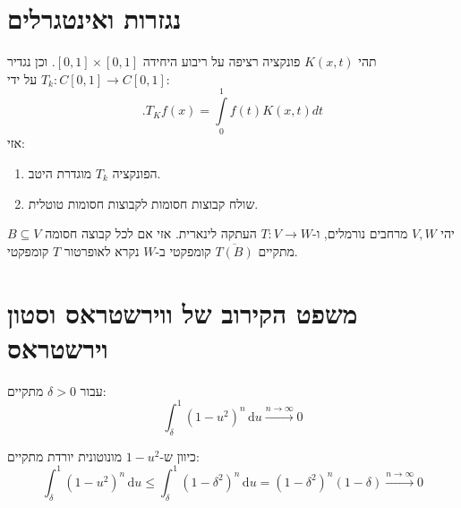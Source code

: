 \documentclass{tstextbook}
\begin{document}
\section{נגזרות ואינטגרלים}

\begin{proposition}
תהי \(K(x,t)\) פונקציה רציפה על ריבוע היחידה \([0,1]\times[0,1]\). וכן נגדיר \(T_{k}:C[0,1]\to C[0,1]\) על ידי:
$$.T_{K}f(x)=\!\!\int\limits_{0}^{1}f(t)K(x,t)d t$$
אזי:

  \begin{enumerate}
    \item הפונקציה \(T_{k}\) מוגדרת היטב. 


    \item שולח קבוצות חסומות לקבוצות חסומות טוטלית. 


  \end{enumerate}
\end{proposition}
\begin{definition}
יהי \(V,W\) מרחבים נורמלים, ו-\(T:V\to W\) העתקה לינארית. אזי אם לכל קבוצה חסומה \(B\subseteq V\) מתקיים \(\overline{T(B)}\) קומפקטי ב-\(W\) נקרא לאופרטור \(T\) קומפקטי.

\end{definition}
\section{משפט הקירוב של ווירשטראס וסטון וירשטראס}

\begin{lemma}
עבור \(\delta> 0\) מתקיים:
$$\int_{\delta}^{1} (1-u^{2})^{n} \, \mathrm{d}u\xrightarrow{n\to \infty} 0  $$

\end{lemma}
כיוון ש-\(1-u^{2}\) מונוטונית יורדת מתקיים:
$$\int_{\delta}^{1} (1-u^{2})^{n} \, \mathrm{d}u\leq  \int_{\delta}^{1} (1-\delta^{2})^{n} \, \mathrm{d}u=(1-\delta^{2})^{n}(1-\delta)\xrightarrow{n\to \infty} 0 $$
\end{document}
